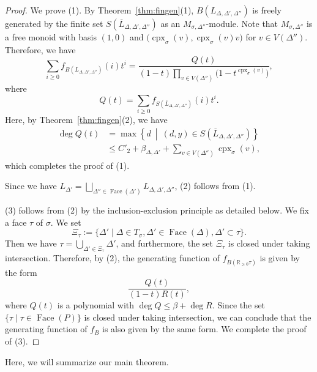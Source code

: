 \documentclass[11pt]{article}
\theoremstyle{definition}
\numberwithin{equation}{section}
\begin{document}
\begin{proof}
We prove (1). 
By Theorem~\ref{thm:fingen}(1), $B \left( L_{\Delta, \Delta ', \Delta''} \right)$ is freely generated by 
the finite set $S \left(\overline{L}_{\Delta, \Delta ', \Delta''} \right)$ as an $M_{\sigma, \Delta ''}$-module. 
Note that $M_{\sigma, \Delta ''}$ is a free monoid with basis $(1,0)$ and 
$\bigl( \operatorname{cpx}_{\sigma}(v), \operatorname{cpx}_{\sigma}(v)v \bigr)$ for 
$v \in V(\Delta '')$. 
Therefore, we have 
\[
\sum _{i \ge 0} f_{B ( L_{\Delta, \Delta ', \Delta''} )}(i) t^i = 
\frac{Q(t)}{(1-t) \prod _{v \in V(\Delta '')} \bigl( 1 - t^{\operatorname{cpx}_{\sigma}(v)} \bigr)}, 
\]
where 
\[
Q(t) = \sum _{i \ge 0} f_{S ( \overline{L}_{\Delta, \Delta ', \Delta''} )}(i) t^i. 
\]
Here, by Theorem~\ref{thm:fingen}(2), we have  
\begin{align*}
\deg Q(t) 
&= \max \left \{ d \ \middle | \ (d,y) \in S \left(\overline{L}_{\Delta, \Delta ', \Delta''} \right) \right \} \\
&\le C'_2 + \beta _{\Delta, \Delta '} + \sum _{v \in V(\Delta '')} \operatorname{cpx}_{\sigma}(v), 
\end{align*}
which completes the proof of (1). 

Since we have 
$L_{\Delta '} = \bigsqcup _{\Delta '' \in \operatorname{Face}(\Delta ')} L_{\Delta, \Delta ', \Delta''}$, (2) follows from (1). 

(3) follows from (2) by the inclusion-exclusion principle as detailed below.  
We fix a face $\tau$ of $\sigma$. We set
\[
\Xi _{\tau} := \{ \Delta ' \mid \Delta \in T_{\sigma}, \Delta ' \in \operatorname{Face}(\Delta), \Delta ' \subset \tau \}. 
\]
Then we have $\tau = \bigcup _{\Delta ' \in \Xi _{\tau}} \Delta '$, 
and furthermore, the set $\Xi _{\tau}$ is closed under taking intersection. 
Therefore, by (2), the generating function of $f_{B(\mathbb{R}_{\ge 0} \tau)}$ is given by the form
\[
\frac{Q(t)}{(1-t)R(t)}, 
\]
where $Q(t)$ is a polynomial with $\deg Q \le \beta + \deg R$. 
Since the set $\{ \tau \mid \tau \in \operatorname{Face}(P) \}$ is closed under taking intersection, 
we can conclude that the generating function of $f_B$ is also given by the same form. 
We complete the proof of (3). 
\end{proof}

Here, we will summarize our main theorem. 
\end{document}
